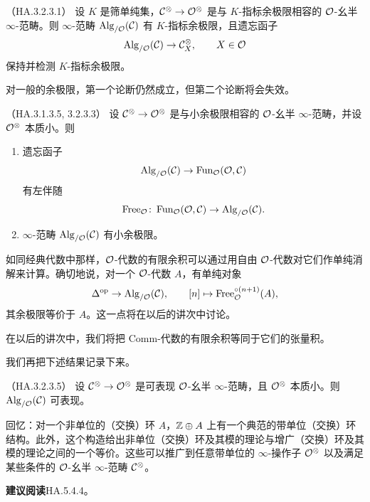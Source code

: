 \begin{theorem}\label{L22-5.7}（HA.3.2.3.1）
设 $K$ 是筛单纯集，$\mathcal{C}^{\otimes}\to\mathcal{O}^{\otimes}$ 是与 $K$-指标余极限相容的 $\mathcal{O}$-幺半 $\infty$-范畴。则 $\infty$-范畴 $\operatorname{Alg}_{/\mathcal{O}}(\mathcal{C})$ 有 $K$-指标余极限，且遗忘函子
\[
\operatorname{Alg}_{/\mathcal{O}}(\mathcal{C})\to\mathcal{C}^{\otimes}_{X},\qquad X\in\mathcal{O}
\]
保持并检测 $K$-指标余极限。
\end{theorem}

\nitem\label{L22-5.8} 对一般的余极限，第一个论断仍然成立，但第二个论断将会失效。

\begin{theorem}\label{L22-5.9}（HA.3.1.3.5, 3.2.3.3）
设 $\mathcal{C}^{\otimes}\to\mathcal{O}^{\otimes}$ 是与小余极限相容的 $\mathcal{O}$-幺半 $\infty$-范畴，并设 $\mathcal{O}^{\otimes}$ 本质小。则
\begin{enumerate}[label=(\roman*),leftmargin=2.6em,itemsep=0.1em]
\item 遗忘函子
\[
\operatorname{Alg}_{/\mathcal{O}}(\mathcal{C})\to\operatorname{Fun}_{\mathcal{O}}(\mathcal{O},\mathcal{C})
\]
有左伴随
\[
\mathrm{Free}_{\mathcal{O}}\colon\operatorname{Fun}_{\mathcal{O}}(\mathcal{O},\mathcal{C})\to\operatorname{Alg}_{/\mathcal{O}}(\mathcal{C}).
\]
\item $\infty$-范畴 $\operatorname{Alg}_{/\mathcal{O}}(\mathcal{C})$ 有小余极限。
\end{enumerate}
\end{theorem}

\begin{remark}\label{L22-5.10}
如同经典代数中那样，$\mathcal{O}$-代数的有限余积可以通过用自由 $\mathcal{O}$-代数对它们作单纯消解来计算。确切地说，对一个 $\mathcal{O}$-代数 $A$，有单纯对象
\[
\Delta^{\mathrm{op}}\to\operatorname{Alg}_{/\mathcal{O}}(\mathcal{C}),\qquad [n]\mapsto\mathrm{Free}_{\mathcal{O}}^{\circ(n+1)}(A),
\]
其余极限等价于 $A$。这一点将在以后的讲次中讨论。
\end{remark}

\begin{remark}\label{L22-5.11}
在以后的讲次中，我们将把 $\mathrm{Comm}$-代数的有限余积等同于它们的张量积。
\end{remark}

\nitem\label{L22-5.12} 我们再把下述结果记录下来。

\begin{proposition}\label{L22-5.13}（HA.3.2.3.5）
设 $\mathcal{C}^{\otimes}\to\mathcal{O}^{\otimes}$ 是可表现 $\mathcal{O}$-幺半 $\infty$-范畴，且 $\mathcal{O}^{\otimes}$ 本质小。则 $\operatorname{Alg}_{/\mathcal{O}}(\mathcal{C})$ 可表现。
\end{proposition}


\nitem\label{L22-A.1} 回忆：对一个非单位的（交换）环 $A$，$\mathbb{Z}\oplus A$ 上有一个典范的带单位（交换）环结构。此外，这个构造给出非单位（交换）环及其模的理论与增广（交换）环及其模的理论之间的一个等价。这些可以推广到任意带单位的 $\infty$-操作子 $\mathcal{O}^{\otimes}$ 以及满足某些条件的 $\mathcal{O}$-幺半 $\infty$-范畴 $\mathcal{C}^{\otimes}$。

\nitem\label{L22-A.2} \textbf{建议阅读}\quad HA.5.4.4。
